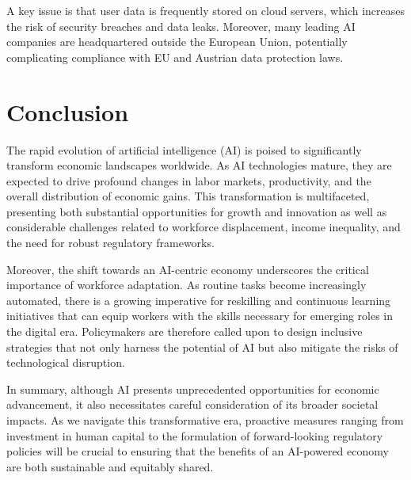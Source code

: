 A key issue is that user data is frequently stored on cloud servers, which increases the risk of security breaches and data leaks. Moreover, many leading AI companies are headquartered outside the European Union, potentially complicating compliance with EU and Austrian data protection laws.


\section{Conclusion}
\label{sec:conclusion}

The rapid evolution of artificial intelligence (AI) is poised to significantly transform economic landscapes worldwide. 
As AI technologies mature, they are expected to drive profound changes in labor markets, productivity, and the overall distribution of economic gains. 
This transformation is multifaceted, presenting both substantial opportunities for growth and innovation as well as considerable challenges related to workforce displacement,
income inequality, and the need for robust regulatory frameworks.

Moreover, the shift towards an AI-centric economy underscores the critical importance of workforce adaptation. 
As routine tasks become increasingly automated, there is a growing imperative for reskilling and continuous learning initiatives that can equip workers with the skills 
necessary for emerging roles in the digital era. Policymakers are therefore called upon to design inclusive strategies that not only harness the potential 
of AI but also mitigate the risks of technological disruption.

In summary, although AI presents unprecedented opportunities for economic advancement, 
it also necessitates careful consideration of its broader societal impacts. As we navigate this transformative era, 
proactive measures ranging from investment in human capital to the formulation of forward-looking regulatory policies 
will be crucial to ensuring that the benefits of an AI-powered economy are both sustainable and equitably shared.
